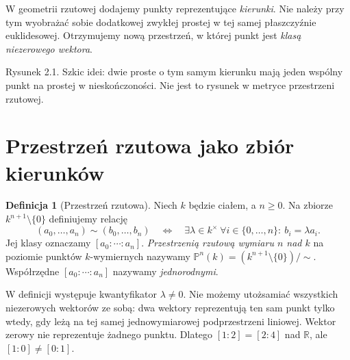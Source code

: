 \documentclass[11pt,a4paper,openany]{report}
\numberwithin{equation}{section}
\theoremstyle{plain}
\theoremstyle{definition}
\newtheorem{definicja}[twierdzenie]{Definicja}
\theoremstyle{remark}
\newcommand{\R}{\mathbb R}
\newcommand{\PP}{\mathbb P}
\begin{document}
W geometrii rzutowej dodajemy punkty reprezentujące \emph{kierunki}.
Nie należy przy tym wyobrażać sobie dodatkowej zwykłej prostej
w tej samej płaszczyźnie euklidesowej. Otrzymujemy nową przestrzeń,
w której punkt jest \emph{klasą niezerowego wektora}.

\begin{center}

\small Rysunek 2.1. Szkic idei: dwie proste o tym samym kierunku mają
jeden wspólny punkt na prostej w nieskończoności. Nie jest to rysunek
w metryce przestrzeni rzutowej.
\end{center}

\section{Przestrzeń rzutowa jako zbiór kierunków}

\begin{definicja}[Przestrzeń rzutowa]
\label{def:projective-space}
Niech $k$ będzie ciałem, a $n\ge0$. Na zbiorze
$k^{n+1}\setminus\{0\}$ definiujemy relację
\[
 (a_0,\ldots,a_n)\sim(b_0,\ldots,b_n)
 \quad\Longleftrightarrow\quad
 \exists\lambda\in k^\times\ \forall i\in\{0,\ldots,n\}:\ b_i=\lambda a_i.
\]
Jej klasy oznaczamy $[a_0:\cdots:a_n]$. \emph{Przestrzenią
rzutową wymiaru $n$ nad $k$} na poziomie punktów $k$-wymiernych
nazywamy $\PP^n(k)=(k^{n+1}\setminus\{0\})/\!\sim$.
Współrzędne $[a_0:\cdots:a_n]$ nazywamy \emph{jednorodnymi}.
\end{definicja}

W definicji występuje kwantyfikator $\lambda\ne0$. Nie możemy
utożsamiać wszystkich niezerowych wektorów ze sobą: dwa wektory
reprezentują ten sam punkt tylko wtedy, gdy leżą na tej samej
jednowymiarowej podprzestrzeni liniowej. Wektor zerowy nie reprezentuje
żadnego punktu. Dlatego $[1:2]=[2:4]$ nad $\R$, ale $[1:0]\ne[0:1]$.
\end{document}
